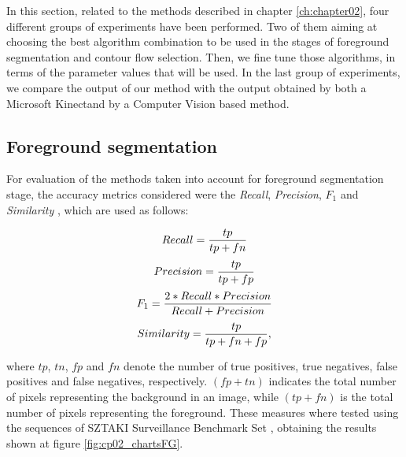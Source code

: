 In this section, related to the methods described in chapter \ref{ch:chapter02}, four different groups of experiments have been performed. Two of them aiming at choosing the best algorithm combination to be used in the stages of foreground segmentation and contour flow selection. Then, we fine tune those algorithms, in terms of the parameter values that will be used. In the last group of experiments, we compare the output of our method with the output obtained by both a Microsoft Kinect\textregistered and by a Computer Vision based method.

\subsection{Foreground segmentation}\label{ch:chapter02_02_01}

For evaluation of the methods taken into account for foreground segmentation stage, the accuracy metrics considered were the \textit{Recall}, \textit{Precision}, \textit{$F_1$} and \textit{Similarity} \citep{maddalena2008self}, which are used as follows:

\begin{equation}\label{eq_Recall}
Recall = { tp \over { tp + fn } }
\end{equation}
\begin{equation}\label{eq_Precision}
Precision = { tp \over { tp + fp } }
\end{equation}
\begin{equation}\label{eq_F1}
F_1 = { {2 * Recall * Precision} \over {Recall + Precision} }
\end{equation}
\begin{equation}\label{eq_Similarity}
Similarity = { tp \over { tp + fn + fp } },
\end{equation}

where $tp$, $tn$, $fp$ and $fn$ denote the number of true positives, true negatives, false positives and false negatives, respectively. $(fp + tn)$ indicates the total number of pixels representing the background in an image, while $(tp + fn)$ is the total number of pixels representing the foreground.
These measures where tested using the sequences of SZTAKI Surveillance Benchmark Set \citep{benedek2008bayesian}, obtaining the results shown at figure \ref{fig:cp02_chartsFG}.

